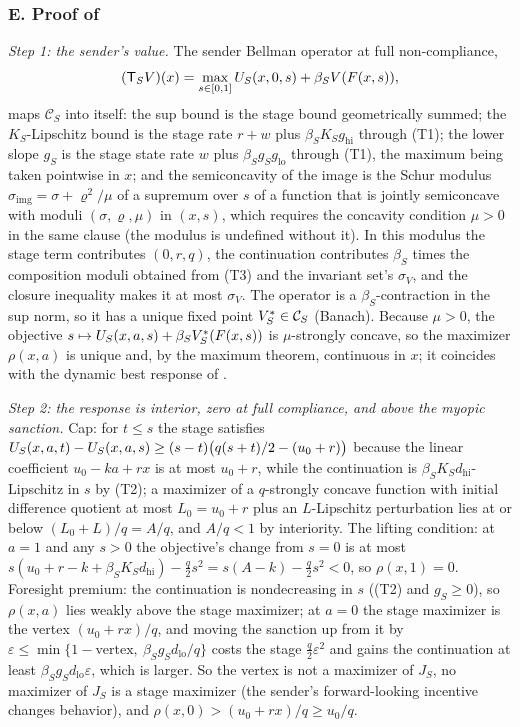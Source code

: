 \subsubsection*{E. Proof of }

\emph{Step 1: the sender's value.} The sender Bellman operator at full
non-compliance,
\[
(\mathsf T_SV)(x)=\max_{s\in[0,1]}U_S(x,0,s)+\beta_SV(F(x,s)),
\]
maps $\mathcal C_S$ into itself: the sup bound is the stage bound geometrically
summed; the $K_S$-Lipschitz bound is the stage rate $r+w$ plus
$\beta_SK_Sg_{\mathrm{hi}}$ through (T1); the lower slope $g_S$ is the stage
state rate $w$ plus $\beta_Sg_Sg_{\mathrm{lo}}$ through (T1), the maximum being
taken pointwise in $x$; and the semiconcavity of the image is the Schur
modulus $\sigma_{\mathrm{img}}=\sigma+\varrho^2/\mu$ of a supremum over $s$
of a function that is jointly semiconcave with moduli $(\sigma,\varrho,\mu)$ in
$(x,s)$, which requires the concavity condition $\mu>0$ in the same clause (the
modulus is undefined without it). In this modulus the stage term contributes $(0,r,q)$, the continuation
contributes $\beta_S$ times the composition moduli obtained from (T3) and
the invariant set's $\sigma_V$, and the closure inequality makes it at most
$\sigma_V$. The operator is a $\beta_S$-contraction in the sup norm, so it
has a unique fixed point $V_S^\ast\in\mathcal C_S$ (Banach). Because $\mu>0$,
the objective $s\mapsto U_S(x,a,s)+\beta_SV_S^\ast(F(x,s))$ is $\mu$-strongly
concave, so the maximizer $\rho(x,a)$ is unique and, by the maximum theorem,
continuous in $x$; it coincides with the dynamic best response of
.

\emph{Step 2: the response is interior, zero at full compliance, and above the myopic sanction.}
Cap: for $t\le s$ the stage satisfies
$U_S(x,a,t)-U_S(x,a,s)\ge(s-t)\bigl(q(s+t)/2-(u_0+r)\bigr)$ because the
linear coefficient $u_0-ka+rx$ is at most $u_0+r$, while the continuation is
$\beta_SK_Sd_{\mathrm{hi}}$-Lipschitz in $s$ by (T2); a maximizer of a
$q$-strongly concave function with initial difference quotient at most $L_0=u_0+r$
plus an $L$-Lipschitz perturbation lies at or below $(L_0+L)/q=A/q$, and
$A/q<1$ by interiority. The lifting condition: at $a=1$ and any $s>0$ the objective's
change from $s=0$ is at most $s(u_0+r-k+\beta_SK_Sd_{\mathrm{hi}})-\tfrac q2s^2
=s(A-k)-\tfrac q2s^2<0$, so $\rho(x,1)=0$. Foresight premium: the continuation is
nondecreasing in $s$ ((T2) and $g_S\ge0$), so $\rho(x,a)$ lies weakly above the
stage maximizer; at $a=0$ the stage maximizer is the vertex
$(u_0+rx)/q$, and moving the sanction up from it by
$\varepsilon\le\min\{1-\text{vertex},\ \beta_Sg_Sd_{\mathrm{lo}}/q\}$ costs the
stage $\tfrac q2\varepsilon^2$ and gains the continuation at least
$\beta_Sg_Sd_{\mathrm{lo}}\varepsilon$, which is larger. So the vertex is not
a maximizer of $J_S$, no maximizer of $J_S$ is a stage maximizer (the sender's
forward-looking incentive changes behavior), and $\rho(x,0)>(u_0+rx)/q\ge u_0/q$.

